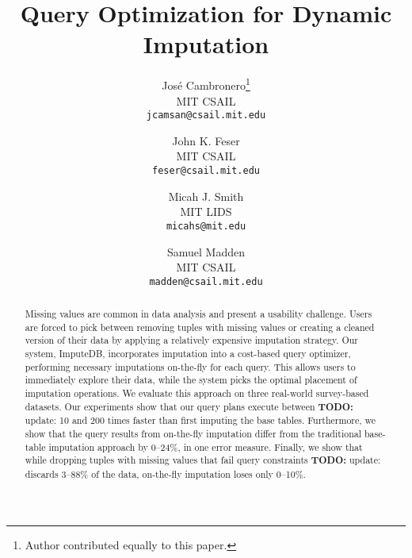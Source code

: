 \documentclass{vldb}
\title{Query Optimization for Dynamic Imputation}
\author{
  Jos\'e Cambronero\thanks{Author contributed equally to this paper.} \\
  MIT CSAIL \\
  \texttt{jcamsan@csail.mit.edu}
  \and
  John K. Feser\footnotemark[1] \\
  MIT CSAIL \\
  \texttt{feser@csail.mit.edu}
  \and
  Micah J. Smith\footnotemark[1] \\
  MIT LIDS \\
  \texttt{micahs@mit.edu}
  \and
  Samuel Madden \\
  MIT CSAIL \\
  \texttt{madden@csail.mit.edu}}
\newcommand{\ProjectName}{ImputeDB\xspace}
\newcommand{\todo}[1]{{\color{red}\textbf{TODO:} #1}}
\newcommand{\lowxalphazero}{10}
\newcommand{\lowsmapealphazero}{0}
\newcommand{\highxalphazeroexacs}{200}
\newcommand{\highsmapealphaoneexacs}{24}
\begin{document}
\maketitle

\begin{abstract}
  Missing values are common in data analysis and present a usability challenge.
  Users are forced to pick between removing tuples with missing values or creating a cleaned version of their data by applying a relatively expensive imputation strategy.
  Our system, \ProjectName{}, incorporates imputation into a cost-based query optimizer, performing necessary imputations on-the-fly for each query.
  This allows users to immediately explore their data, while the system picks the optimal placement of imputation operations.
  We evaluate this approach on three real-world survey-based datasets.
  Our experiments show that our query plans execute between \todo{update: \lowxalphazero{} and \highxalphazeroexacs{}} times faster than first imputing the base tables.
  Furthermore, we show that the query results from on-the-fly imputation differ from the
  traditional base-table imputation approach by \lowsmapealphazero{}--\highsmapealphaoneexacs{}\%, in one error measure.
  Finally, we show that while dropping tuples with missing values that fail query constraints \todo{update: discards 3--88\% of the data, on-the-fly imputation loses only 0--10\%}.
\end{abstract}








\balance
\printbibliography
\end{document}
